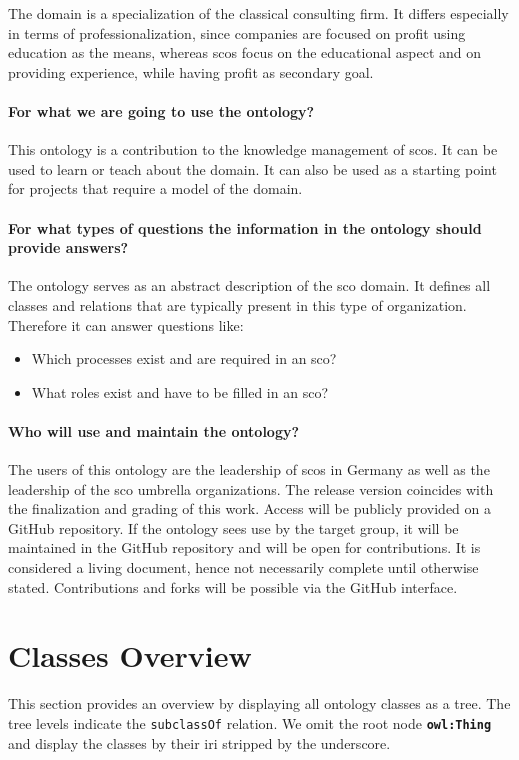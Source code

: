 \documentclass[a4paper, DIV=13, BCOR=0cm]{scrbook}
\newcommand{\class}[1]{\texttt{\textbf{#1}}}
\newcommand{\relation}[1]{\texttt{#1}}
\begin{document}
The domain is a specialization of the classical consulting firm. It differs especially in terms of professionalization, since companies are focused on profit using education as the means, whereas \glspl{sco} focus on the educational aspect and on providing experience, while having profit as secondary goal.

\paragraph{For what we are going to use the ontology?}
This ontology is a contribution to the knowledge management of \glspl{sco}. It can be used to learn or teach about the domain. It can also be used as a starting point for projects that require a model of the domain.

\paragraph{For what types of questions the information in the ontology should provide answers?}
The ontology serves as an abstract description of the \gls{sco} domain. It defines all classes and relations that are typically present in this type of organization. Therefore it can answer questions like:
\begin{itemize}
	\item Which processes exist and are required in an \gls{sco}?
	\item What roles exist and have to be filled in an \gls{sco}?
\end{itemize}

\paragraph{Who will use and maintain the ontology?}
The users of this ontology are the leadership of \glspl{sco} in Germany as well as the leadership of the \gls{sco} umbrella organizations. The release version coincides with the finalization and grading of this work. Access will be publicly provided on a GitHub repository. If the ontology sees use by the target group, it will be maintained in the GitHub repository and will be open for contributions. It is considered a living document, hence not necessarily complete until otherwise stated. Contributions and forks will be possible via the GitHub interface.

\section{Classes Overview}
This section provides an overview by displaying all ontology classes as a tree. The tree levels indicate the \relation{subclassOf} relation. We omit the root node \class{owl:Thing} and display the classes by their \gls{iri} stripped by the underscore.
\end{document}

